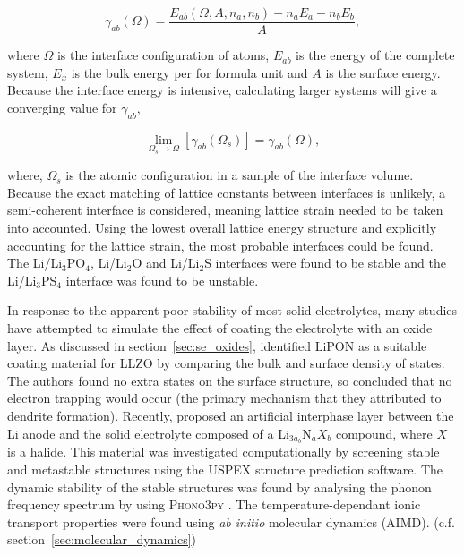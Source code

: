 \documentclass[../main.tex]{subfiles}
\begin{document}
\begin{equation}
    \gamma_{ab}(\Omega)=\frac{E_{ab}(\Omega,A,n_a,n_b)-n_aE_a-n_bE_b}{A},
\end{equation}

where $\Omega$ is the interface configuration of atoms, $E_{ab}$ is the energy of the complete system, $E_x$ is the bulk energy per for formula unit and $A$ is the surface energy. Because the interface energy is intensive, calculating larger systems will give a converging value for $\gamma_{ab}$,

\begin{equation}
    \lim_{\Omega_s \rightarrow \Omega} \left[\gamma_{ab}(\Omega_s)\right]=\gamma_{ab}(\Omega),
\end{equation}

where, $\Omega_s$ is the atomic configuration in a sample of the interface volume. Because the exact matching of lattice constants between interfaces is unlikely, a semi-coherent interface is considered, meaning lattice strain needed to be taken into accounted. Using the lowest overall lattice energy structure and explicitly accounting for the lattice strain, the most probable interfaces could be found. The Li/Li$_3$PO$_4$, Li/Li$_2$O and Li/Li$_2$S interfaces were found to be stable and the Li/Li$_3$PS$_4$ interface was found to be unstable.\cite{Lepley2015}

In response to the apparent poor stability of most solid electrolytes, many studies have attempted to simulate the effect of coating the electrolyte with an oxide layer\cite{Zhang2020directvis, Xiao2019coat, Tian2018}. As discussed in section~\ref{sec:se_oxides}, \citeauthor{Tian2018} identified LiPON as a suitable coating material for LLZO by comparing the bulk and surface density of states\cite{Tian2018}. The authors found no extra states on the surface structure, so concluded that no electron trapping would occur (the primary mechanism that they attributed to dendrite formation). Recently, \citeauthor{Sang2020} proposed an artificial interphase layer between the Li anode and the solid electrolyte composed of a Li$_{3a_b}$N$_{a}X_{b}$ compound, where $X$ is a halide.\cite{Sang2020} 
This material was investigated computationally by screening stable and metastable structures using the USPEX structure prediction software.\cite{Glass2006, Oganov2006} The dynamic stability of the stable structures was found by analysing the phonon frequency spectrum by using \textsc{Phono3py} \cite{Parlinski1997, Togo2008,togo_distributions_2015}. The temperature-dependant ionic transport properties were found using \textit{ab initio} molecular dynamics (AIMD). (c.f. section~\ref{sec:molecular_dynamics})
\end{document}
